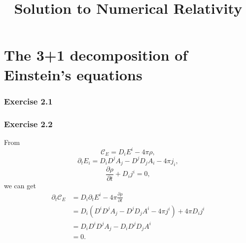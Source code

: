 \documentclass{article}
\begin{document}
\title{Solution to Numerical Relativity}
\maketitle
\tableofcontents

\cleardoublepage

\setcounter{section}{1}
\section{The 3+1 decomposition of Einstein's equations}
\subsubsection*{Exercise 2.1}
\subsubsection*{Exercise 2.2}
From
\begin{equation}
	\mathcal{C}_E = D_i E^i - 4 \pi \rho,
\end{equation}
\begin{equation}
	\partial_t E_i = D_i D^j A_j - D^j D_j A_i - 4 \pi j_i,
\end{equation}
\begin{equation}
	\frac{\partial \rho}{\partial t} + D_i j^i = 0,
\end{equation}
we can get
\begin{align}
	\partial_t \mathcal{C}_E &= D_i \partial_t E^i - 4\pi \frac{\partial \rho}{\partial t}\\
	&= D_i (D^i D^j A_j - D^j D_j A^i - 4\pi j^i) + 4\pi D_i j^i\\
	&= D_i D^i D^j A_j - D_i D^j D_j A^i\\
	&= 0.
\end{align}
\end{document}
